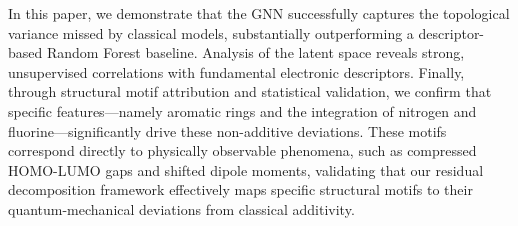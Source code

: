 \documentclass[]{article}
\begin{document}
In this paper, we demonstrate that the GNN successfully captures the topological variance missed by classical models, substantially outperforming a descriptor-based Random Forest baseline. Analysis of the latent space reveals strong, unsupervised correlations with fundamental electronic descriptors. Finally, through structural motif attribution and statistical validation, we confirm that specific features—namely aromatic rings and the integration of nitrogen and fluorine—significantly drive these non-additive deviations. These motifs correspond directly to physically observable phenomena, such as compressed HOMO-LUMO gaps and shifted dipole moments, validating that our residual decomposition framework effectively maps specific structural motifs to their quantum-mechanical deviations from classical additivity.
\end{document}
